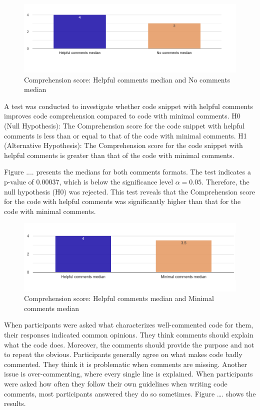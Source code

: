 \begin{figure} [H]
  \centering
  \includegraphics[scale=0.4]{figures/h-0-q3.png}
  \caption{Comprehension score:  Helpful comments median and No comments median}
  \label{fig:AnhangsChor}
\end{figure}




A test was conducted to investigate whether code snippet with helpful comments improves code comprehension compared to code with minimal comments. H0 (Null Hypothesis): The Comprehension score for the code snippet with helpful comments is less than or equal to that of the code with minimal comments.  H1 (Alternative Hypothesis): The Comprehension score for the code snippet with helpful comments is greater than that of the code with minimal comments.

Figure .... presents the medians for both comments formats.
The test indicates a p-value of 0.00037, which is below the significance level $\alpha = 0.05$. Therefore, the null hypothesis (H0) was rejected.  This test reveals that the Comprehension score for the code with helpful comments was significantly higher than that for the code with minimal comments. 

\begin{figure} [H]
  \centering
  \includegraphics[scale=0.4]{figures/h-m-q3.png}
  \caption{Comprehension score:  Helpful comments median and Minimal comments median}
  \label{fig:AnhangsChor}
\end{figure}



When participants were asked what characterizes well-commented code for them, their responses indicated common opinions. They think comments should explain what the code does. Moreover, the comments should provide the purpose and not to repeat the obvious. Participants generally agree on what makes code badly commented. They think it is problematic when comments are missing. Another issue is over-commenting, where every single line is explained.
When participants were asked how often they follow their own guidelines when writing code comments, most participants answered they do so sometimes. Figure …. shows the results.

